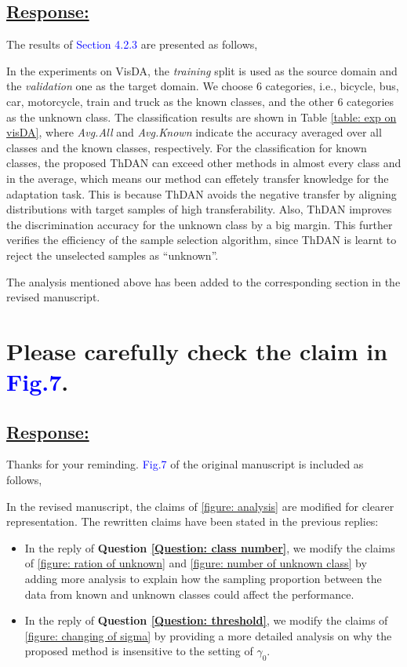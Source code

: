 \subsection*{\underline{\textbf{Response:}}}

The results of \textcolor{blue}{Section 4.2.3} are presented as follows,


In the experiments on VisDA, the \textit{training} split is used as the source domain and the \textit{validation} one as the target domain.
We choose 6 categories, i.e., bicycle, bus, car, motorcycle, train and truck as the known classes, and the other 6 categories as the unknown class.
The classification results are shown in Table \ref{table: exp on visDA}, where \textit{Avg.All} and \textit{Avg.Known} indicate the accuracy averaged over all classes and the known classes, respectively.
For the classification for known classes, the proposed ThDAN can exceed other methods in almost every class and in the average, which means our method can effetely transfer knowledge for the adaptation task.
This is because ThDAN avoids the negative transfer by aligning distributions with target samples of high transferability.
Also, ThDAN improves the discrimination accuracy for the unknown class by a big margin.
This further verifies the efficiency of the sample selection algorithm, since ThDAN is learnt to reject the unselected samples as ``unknown''.

The analysis mentioned above has been added to the corresponding section in the revised manuscript.

\section{Please carefully check the claim in \textcolor{blue}{Fig.7}.}
\subsection*{\underline{\textbf{Response:}}}

Thanks for your reminding.
\textcolor{blue}{Fig.7} of the original manuscript is included as follows,


In the revised manuscript, the claims of \figurename{\ref{figure: analysis}} are modified for clearer representation.
The rewritten claims have been stated in the previous replies:
\begin{itemize}
    \item  In the reply of \textbf{Question \ref{Question: class number}}, we modify the claims of \figurename{\ref{figure: ration of unknown}} and \figurename{\ref{figure: number of unknown class}} by adding more analysis to explain how the sampling proportion between the data from known and unknown classes could affect the performance.
    \item In the reply of \textbf{Question \ref{Question: threshold}}, we modify the claims of \figurename{\ref{figure: changing of sigma}} by providing a more detailed analysis on why the proposed method is insensitive to the setting of $\gamma_0$.
\end{itemize}

